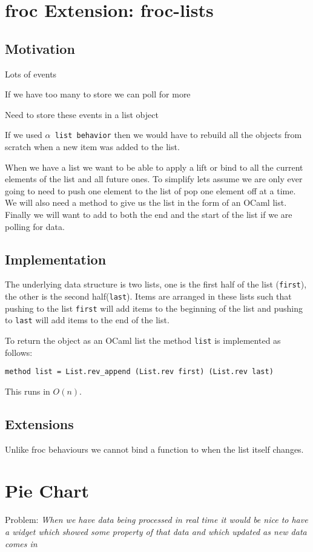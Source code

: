 \section{froc Extension: froc-lists}
\subsection{Motivation}
Lots of events

If we have too many to store we can poll for more

Need to store these events in a list object

If we used \texttt{\textnormal{$\alpha$} list behavior} then we would have to rebuild all the objects from scratch when a new item was added to the list.

When we have a list we want to be able to apply a lift or bind to all the current elements of the list and all future ones. To simplify lets assume we are only ever going to need to push one element to the list of pop one element off at a time. We will also need a method to give us the list in the form of an OCaml list. Finally we will want to add to both the end and the start of the list if we are polling for data.

\subsection{Implementation}

The underlying data structure is two lists, one is the first half of the list (\texttt{first}), the other is the second half(\texttt{last}). Items are arranged in these lists such that pushing to the list \texttt{first} will add items to the beginning of the list and pushing to \texttt{last} will add items to the end of the list.

To return the object as an OCaml list the method \texttt{list} is implemented as follows:

\texttt{method list = List.rev\_append (List.rev first) (List.rev last)}

This runs in \texttt{$O(n)$}.

\subsection{Extensions}
Unlike froc behaviours we cannot bind a function to when the list itself changes.

\section{Pie Chart}
Problem: \emph{When we have data being processed in real time it would be nice to have a widget which showed some property of that data and which updated as new data comes in}

